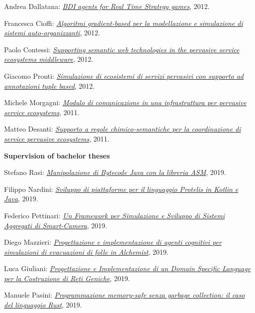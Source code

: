 \begin{outerlist}
\begin{innerlist}
      \item Andrea Dallatana: \href{http://amslaurea.unibo.it/4217/}{\textit{BDI agents for Real Time Strategy games}}, 2012.
      \item Francesca Cioffi: \href{http://amslaurea.unibo.it/4088/}{\textit{Algoritmi gradient-based per la modellazione e simulazione di sistemi auto-organizzanti}}, 2012.
      \item Paolo Contessi: \href{http://amslaurea.unibo.it/4074/}{\textit{Supporting semantic web technologies in the pervasive service ecosystems middleware}}, 2012.
      \item Giacomo Pronti: \href{http://archive.fo/nBeOg}{\textit{Simulazione di ecosistemi di servizi pervasivi con supporto ad annotazioni tuple based}}, 2012.
      \item Michele Morgagni: \href{http://archive.fo/6mnSN}{\textit{Modulo di comunicazione in una infrastruttura per pervasive service ecosystems}}, 2011.
      \item Matteo Desanti: \href{http://archive.fo/rwla1}{\textit{Supporto a regole chimico-semantiche per la coordinazione di service pervasive ecosystems}}, 2011.
    \end{innerlist}
\item[] \textbf{Supervision of bachelor theses} %
    \begin{innerlist}
      \item Stefano Rasi: \href{https://amslaurea.unibo.it/20505/}{\textit{Manipolazione di Bytecode Java con la libreria ASM}}, 2019.
      \item Filippo Nardini: \href{https://amslaurea.unibo.it/19778/}{\textit{Sviluppo di piattaforme per il linguaggio Protelis in Kotlin e Java}}, 2019.
      \item Federico Pettinari: \href{https://amslaurea.unibo.it/19092/}{\textit{Un Framework per Simulazione e Sviluppo di Sistemi Aggregati di Smart-Camera}}, 2019.
      \item Diego Mazzieri: \href{https://amslaurea.unibo.it/19084/}{\textit{Progettazione e implementazione di agenti cognitivi per simulazioni di evacuazioni di folle in Alchemist}}, 2019.
      \item Luca Giuliani: \href{https://amslaurea.unibo.it/19071/}{\textit{Progettazione e Implementazione di un Domain Specific Language per la Costruzione di Reti Geniche}}, 2019.
      \item Manuele Pasini: \href{http://amslaurea.unibo.it/18535/}{\textit{Programmazione memory-safe senza garbage collection: il caso del linguaggio Rust}}, 2019.

\end{innerlist}
\end{outerlist}
